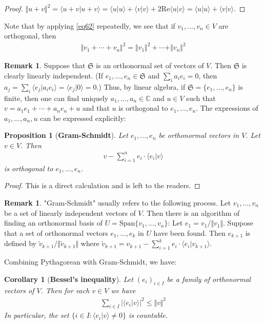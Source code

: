 \documentclass[12pt,b5paper,notitlepage]{article}
\theoremstyle{definition}
\newtheorem{rem}[df]{Remark}
\theoremstyle{plain}
\newtheorem{pp}[df]{Proposition}
\newtheorem{co}[df]{Corollary}
\newcommand{\fk}{\mathfrak}
\newcommand{\wtd}{\widetilde}
\newcommand{\Span}{\mathrm{Span}}
\newcommand{\bk}[1]{\langle {#1}\rangle}
\newcommand{\Cbb}{\mathbb C}
\newcommand{\Real}{\mathrm{Re}}
\numberwithin{equation}{section}
\begin{document}
\begin{proof}
$\Vert u+v\Vert^2=\bk{u+v|u+v}=\bk{u|u}+\bk{v|v}+2\Real \bk{u|v}=\bk{u|u}+\bk{v|v}$.
\end{proof}


Note that by applying \eqref{eq62} repeatedly, we see that if $v_1,\dots,v_n\in V$ are orthogonal, then
\begin{align}\label{eq64}
\Vert v_1+\cdots+v_n\Vert^2=\Vert v_1\Vert^2+\cdots+\Vert v_n\Vert^2
\end{align}



\begin{rem}
Suppose that $\fk S$ is an orthonormal set of vectors of $V$. Then $\fk S$ is clearly linearly independent. (If $e_1,\dots,e_n\in\fk S$ and $\sum_i a_ie_i=0$, then $a_j=\sum_i\bk{e_j|a_ie_i}=\bk{e_j|0}=0$.) Thus, by linear algebra, if $\fk S=\{e_1,\dots,e_n\}$ is finite, then one can find uniquely $a_1,\dots,a_n\in\Cbb$ and $u\in V$ such that $v=a_1e_1+\cdots+a_ne_n+u$ and that $u$ is orthogonal to $e_1,\dots,e_n$. The expressions of $a_1,\dots,a_n,u$ can be expressed explicitly:
\end{rem}


\begin{pp}[\textbf{Gram-Schmidt}]
Let $e_1,\dots,e_n$ be orthonormal vectors in $V$. Let $v\in V$. Then
\begin{align}
v-\sum_{i=1}^n e_i\cdot \bk{e_i|v}
\end{align}
is orthogonal to $e_1,\dots,e_n$.
\end{pp}

\begin{proof}
This is a direct calculation and is left to the readers.
\end{proof}


\begin{rem}\label{lb117}
"Gram-Schmidt" usually refers to the following process. Let $v_1,\dots,v_n$ be a set of linearly independent vectors of $V$. Then there is an algorithm of finding an orthonormal basis of $U=\Span\{v_1,\dots,v_n\}$: Let $e_1=v_1/\Vert v_1\Vert$. Suppose that a set of orthonormal vectors $e_1,\dots,e_k$ in $U$ have been found. Then $e_{k+1}$ is defined by $\wtd v_{k+1}/\Vert\wtd v_{k+1}\Vert$ where $\wtd v_{k+1}=v_{k+1}-\sum_{i=1}^k e_i\cdot\bk{e_i|v_{k+1}}$.
\end{rem}



Combining Pythagorean with Gram-Schmidt, we have:
\begin{co}[\textbf{Bessel's inequality}]\label{lb118}
Let $(e_i)_{i\in I}$ be a family of orthonormal vectors of $V$. Then for each $v\in V$ we have
\begin{align}\label{eq65}
\sum_{i\in I}|\bk{e_i|v}|^2\leq \Vert v\Vert^2
\end{align}
In particular, the set $\{i\in I:\bk{e_i|v}\neq0\}$ is countable.
\end{co}
\end{document}
